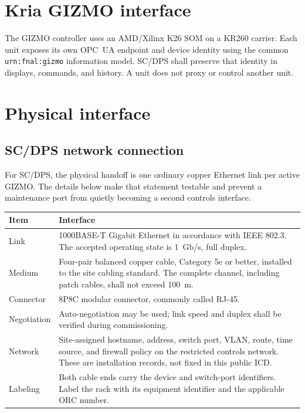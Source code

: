 \documentclass{cernatlasnote}
\newcommand{\code}[1]{\nolinkurl{#1}}
\begin{document}
\section{Kria GIZMO interface}

The GIZMO controller uses an AMD/Xilinx K26 SOM on a KR260 carrier.
Each unit exposes its own OPC~UA endpoint and device identity using the common
\code{urn:fnal:gizmo} information model. SC/DPS shall preserve that identity in
displays, commands, and history. A unit does not proxy or control another unit.

\section{Physical interface}

\subsection{SC/DPS network connection}

For SC/DPS, the physical handoff is one ordinary copper Ethernet link per
active GIZMO. The details below make that statement testable and prevent a
maintenance port from quietly becoming a second controls interface.

\Needspace{0.34\textheight}
\begin{longtable}{L{0.25\textwidth} L{0.65\textwidth}}
\toprule
\textbf{Item} & \textbf{Interface} \\
\midrule
Link & 1000BASE-T Gigabit Ethernet in accordance with IEEE 802.3. The accepted
operating state is 1~Gb/s, full duplex. \\
Medium & Four-pair balanced copper cable, Category 5e or better, installed to
the site cabling standard. The complete channel, including patch cables, shall
not exceed 100~m. \\
Connector & 8P8C modular connector, commonly called RJ-45. \\
Negotiation & Auto-negotiation may be used; link speed and duplex shall be
verified during commissioning. \\
Network & Site-assigned hostname, address, switch port, VLAN, route, time
source, and firewall policy on the restricted controls network. These are
installation records, not fixed in this public ICD. \\
Labeling & Both cable ends carry the device and switch-port identifiers.
Label the rack with its equipment identifier and the applicable ORC number. \\
\bottomrule
\end{longtable}
\end{document}
